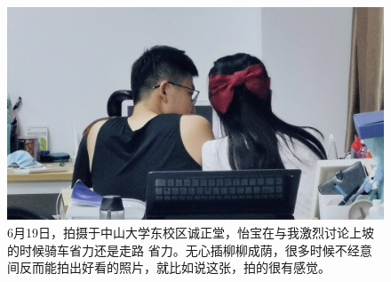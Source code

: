 \documentclass[cn,11pt,chinese]{elegantbook}
\begin{document}
\begin{figure}
   \includegraphics[height=0.2\textheight]{figure/figure/bicycle.jpg} 
   \caption{6月19日，拍摄于中山大学东校区诚正堂，怡宝在与我激烈讨论上坡的时候骑车省力还是走路
   省力。无心插柳柳成荫，很多时候不经意间反而能拍出好看的照片，就比如说这张，拍的很有感觉。}
\end{figure}
\end{document}
